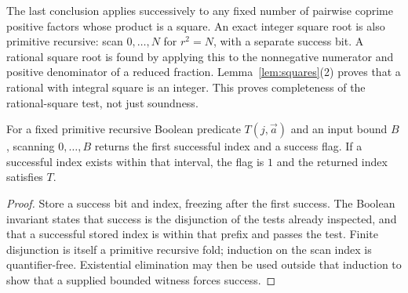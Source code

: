 The last conclusion applies successively to any fixed number of pairwise
coprime positive factors whose product is a square. An exact integer
square root is also primitive recursive: scan $0,\ldots,N$ for $r^2=N$,
with a separate success bit. A rational square root is found by applying
this to the nonnegative numerator and positive denominator of a reduced
fraction. Lemma~\ref{lem:squares}(2) proves that a rational with integral
square is an integer. This proves completeness of the rational-square
test, not just soundness.

\begin{lemma}\label{lem:scan}
For a fixed primitive recursive Boolean predicate $T(j,\vec a)$ and an
input bound $B$, scanning $0,\ldots,B$ returns the first successful index
and a success flag. If a successful index exists within that interval,
the flag is $1$ and the returned index satisfies $T$.
\end{lemma}
\begin{proof}
Store a success bit and index, freezing after the first success. The
Boolean invariant states that success is the disjunction of the tests
already inspected, and that a successful stored index is within that
prefix and passes the test. Finite disjunction is itself a primitive
recursive fold; induction on the scan index is quantifier-free.
Existential elimination may then be used outside that induction to show
that a supplied bounded witness forces success.
\end{proof}
